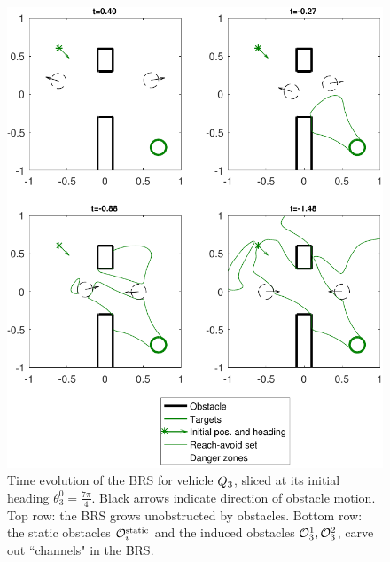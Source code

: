 \begin{figure}
	\centering
	\includegraphics[width=\columnwidth]{"fig/dubins_reach_3"}
	\caption{Time evolution of the BRS for vehicle $Q_3$, sliced at its initial heading $\theta_3^0=\frac{7\pi}{4}$. Black arrows indicate direction of obstacle motion. Top row: the BRS grows unobstructed by obstacles. Bottom row: the static obstacles $\mathcal{O}^\text{static}_i$ and the induced obstacles $\mathcal{O}_3^1,\mathcal{O}_3^2$, carve out ``channels" in the BRS.}
	\label{fig:dubins_reach_3}
\end{figure}

